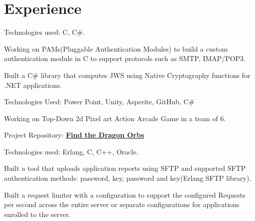 \documentclass[]{deedy-resume-openfont}
\begin{document}
\begin{minipage}[t]{0.64\textwidth} 


\section{Experience}
\vspace{\topsep} %
\begin{tightemize}\item Technologies used: C, C\#.
\item Working on PAMs(Pluggable Authentication Modules) to build a custom authentication module in C to support protocols such as SMTP, IMAP/POP3.
\item Built a C\# library that computes JWS using Native Cryptography functions for .NET applications.
\end{tightemize}
\sectionsep

\begin{tightemize}
\item Technologies Used: Power Point, Unity, Asperite, GitHub, C\#
\item Working on Top-Down 2d Pixel art Action Arcade Game in a team of 6.
\item Project Repository: \textbf{\href{https://github.com/tarun-medida/FindTheDragonOrbs}{Find the Dragon Orbs}}
\end{tightemize}
\sectionsep

\begin{tightemize}\item Technologies used: Erlang, C, C++, Oracle.
\item Built a tool that uploads application reports using SFTP and supported SFTP authentication methods: password, key, password and key(Erlang SFTP library).
\item Built a request limiter with a configuration to support the configured Requests per second across the entire server or separate configurations for applications enrolled to the server.
\end{tightemize}
\sectionsep


\end{minipage}
\end{document}
